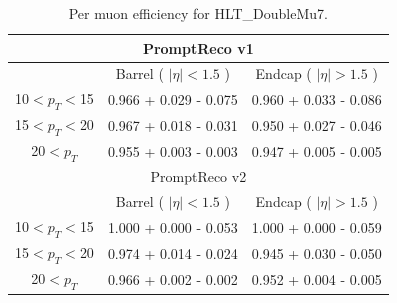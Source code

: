 \begin{table}[!ht]
\begin{center}
\begin{tabular}{c|c|c} 
\hline
\multicolumn{3}{c}{PromptReco v1}                                \\
\hline
              & Barrel ( $|\eta|<1.5$ )  & Endcap ( $|\eta|>1.5$ ) \\  
\hline
\hline
10$<p_{T}<$15 & 0.966 + 0.029 - 0.075  & 0.960 + 0.033 - 0.086     \\  \hline
15$<p_{T}<$20 & 0.967 + 0.018 - 0.031  & 0.950 + 0.027 - 0.046     \\  \hline
20$<p_{T}$   & 0.955 + 0.003 - 0.003  & 0.947 + 0.005 - 0.005      \\
\hline
\hline
\multicolumn{3}{c}{PromptReco v2}                                \\
\hline
              & Barrel ( $|\eta|<1.5$ )  & Endcap ( $|\eta|>1.5$ ) \\  
\hline
\hline
10$<p_{T}<$15 & 1.000 + 0.000 - 0.053  & 1.000 + 0.000 - 0.059     \\  \hline
15$<p_{T}<$20 & 0.974 + 0.014 - 0.024  & 0.945 + 0.030 - 0.050     \\  \hline
20$<p_{T}$   & 0.966 + 0.002 - 0.002  & 0.952 + 0.004 - 0.005      \\
\hline
\end{tabular}
\caption{Per muon efficiency for HLT\_DoubleMu7.}
\label{tab:eff_double_mu}
\end{center}
\end{table}

